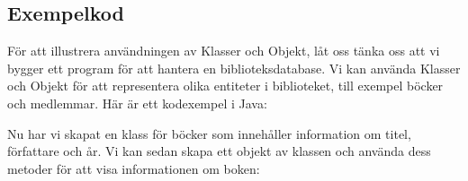 \hypertarget{exempelkod}{%
\subsection{Exempelkod}\label{exempelkod}}

För att illustrera användningen av Klasser och Objekt, låt oss tänka oss
att vi bygger ett program för att hantera en biblioteksdatabase. Vi kan
använda Klasser och Objekt för att representera olika entiteter i
biblioteket, till exempel böcker och medlemmar. Här är ett kodexempel i
Java:

\hypertarget{cb1}{}
\begin{Shaded}
\begin{Highlighting}[]
   \OperatorTok{\{}
 \OperatorTok{;}
 \OperatorTok{;}
 \OperatorTok{;}

 \OperatorTok{(}\OperatorTok{,} \OperatorTok{,} \OperatorTok{)} \OperatorTok{\{}
 \OperatorTok{=}\OperatorTok{;}
 \OperatorTok{=}\OperatorTok{;}
 \OperatorTok{=}\OperatorTok{;}
\OperatorTok{\}}

  \OperatorTok{()} \OperatorTok{\{}
\OperatorTok{(} \OperatorTok{+}\OperatorTok{);}
\OperatorTok{(} \OperatorTok{+}\OperatorTok{);}
\OperatorTok{(} \OperatorTok{+}\OperatorTok{);}
\OperatorTok{\}}
\OperatorTok{\}}
\end{Highlighting}
\end{Shaded}

Nu har vi skapat en klass för böcker som innehåller information om
titel, författare och år. Vi kan sedan skapa ett objekt av klassen och
använda dess metoder för att visa informationen om boken:

